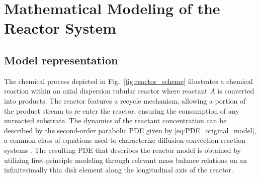 \section{Mathematical Modeling of the Reactor System}

\subsection{Model representation}

The chemical process depicted in Fig.~\ref{fig:reactor_scheme} illustrates a chemical reaction within an axial dispersion tubular reactor \cite{levenspiel1998chemical} where reactant $A$ is converted into products. The reactor features a recycle mechanism, allowing a portion of the product stream to re-enter the reactor, ensuring the consumption of any unreacted substrate. The dynamics of the reactant concentration can be described by the second-order parabolic PDE given by \eqref{eq:PDE_original_model}, a common class of equations used to characterize diffusion-convection-reaction systems \cite{jensen1982bifurcation}. The resulting PDE that describes the reactor model is obtained by utilizing first-principle modeling through relevant mass balance relations on an infinitesimally thin disk element along the longitudinal axis of the reactor.

